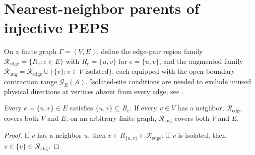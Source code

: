 \section{Nearest-neighbor parents of injective PEPS}%
\label{sec:peps_injective_nearest_neighbor_parent}

\begin{definition}%
    \label{def:peps_injective_nearest_neighbor_regions}
    \leanok
    On a finite graph $\Gamma=(V,E)$, define the edge-pair region family
    $\mathcal R_{\mathrm{edge}}=\{R_e:e\in E\}$ with $R_e=\{u,v\}$ for
    $e=\{u,v\}$, and the augmented family
    $\mathcal R_{\mathrm{aug}}=\mathcal R_{\mathrm{edge}}\cup\{\{v\}:v\in V\text{ isolated}\}$,
    each equipped with the open-boundary contraction range $\mathcal G_R(A)$.
    Isolated-site conditions are needed to exclude
    unused physical directions at vertices absent from every edge;
    see \cite{gap:cpgsv21_injective_parent_reconstruction}.
\end{definition}

\begin{lemma}%
    \label{lem:peps_injective_nearest_neighbor_cover}
    \leanok
    Every $e=\{u,v\}\in E$ satisfies $\{u,v\}\subseteq R_e$. If every $v\in V$
    has a neighbor, $\mathcal R_{\mathrm{edge}}$ covers both $V$ and $E$; on an
    arbitrary finite graph, $\mathcal R_{\mathrm{aug}}$ covers both $V$ and $E$.
\end{lemma}

\begin{proof}\leanok
    If $v$ has a neighbor $u$, then $v\in R_{\{u,v\}}\in\mathcal R_{\mathrm{edge}}$;
    if $v$ is isolated, then $v\in\{v\}\in\mathcal R_{\mathrm{aug}}$.
\end{proof}


